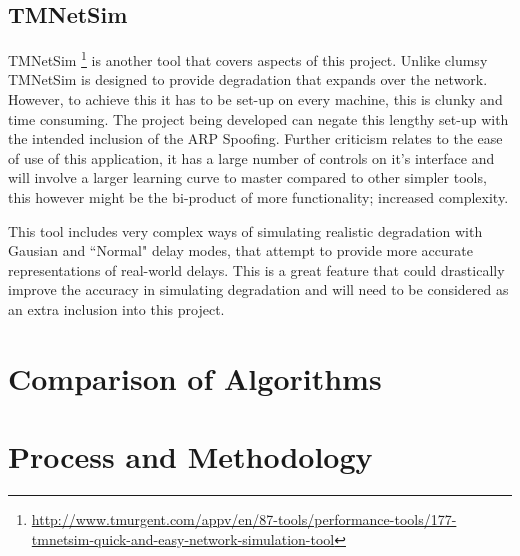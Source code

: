 \subsection{TMNetSim}
TMNetSim \footnote{\url{http://www.tmurgent.com/appv/en/87-tools/performance-tools/177-tmnetsim-quick-and-easy-network-simulation-tool}} is another tool that covers aspects of this project. Unlike clumsy TMNetSim is designed to provide degradation that expands over the network. However, to achieve this it has to be set-up on every machine, this is clunky and time consuming. The project being developed can negate this lengthy set-up with the intended inclusion of the ARP Spoofing. Further criticism relates to the ease of use of this application, it has a large number of controls on it's interface and will involve a larger learning curve to master compared to other simpler tools, this however might be the bi-product of more functionality; increased complexity.

This tool includes very complex ways of simulating realistic degradation with Gausian and ``Normal" delay modes, that attempt to provide more accurate representations of real-world delays. This is a great feature that could drastically improve the accuracy in simulating degradation and will need to be considered as an extra inclusion into this project.

\section{Comparison of Algorithms}



\section{Process and Methodology}
